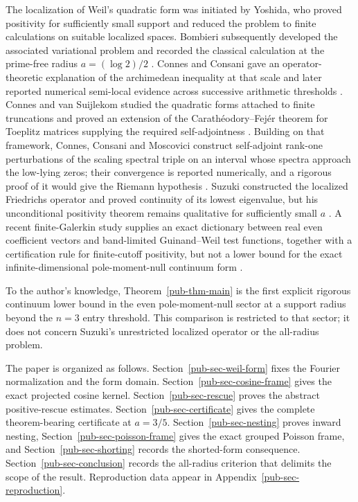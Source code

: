 \documentclass[11pt]{article}
\theoremstyle{remark}
\begin{document}
The localization of Weil's quadratic form was initiated by Yoshida,
who proved positivity for sufficiently small support and reduced the problem to finite calculations on suitable localized spaces.
Bombieri subsequently developed the associated variational problem and recorded the classical calculation at the prime-free radius \(a=(\log 2)/2\) \cite{Yoshida1992,Bombieri2000,Bombieri2003}.
Connes and Consani gave an operator-theoretic explanation of the archimedean inequality at that scale and later reported numerical semi-local evidence across successive arithmetic thresholds \cite{ConnesConsani2021,ConnesConsani2023}.
Connes and van Suijlekom studied the quadratic forms attached to finite truncations and proved an extension of the Carath\'eodory--Fej\'er theorem for Toeplitz matrices supplying the required self-adjointness \cite{ConnesVanSuijlekom2025}.
Building on that framework, Connes, Consani and Moscovici construct self-adjoint rank-one perturbations of the scaling spectral triple on an interval whose spectra approach the low-lying zeros;
their convergence is reported numerically, and a rigorous proof of it would give the Riemann hypothesis \cite{ConnesConsaniMoscovici2025}.
Suzuki constructed the localized Friedrichs operator and proved continuity of its lowest eigenvalue,
but his unconditional positivity theorem remains qualitative for sufficiently small \(a\) \cite{Suzuki2023,Suzuki2026}.
A recent finite-Galerkin study supplies an exact dictionary between real even coefficient vectors and band-limited Guinand--Weil test functions, together with a certification rule for finite-cutoff positivity,
but not a lower bound for the exact infinite-dimensional pole-moment-null continuum form \cite{Groskin2026}.

To the author's knowledge, Theorem~\ref{pub-thm-main} is the first explicit rigorous continuum lower bound in the even pole-moment-null sector at a support radius beyond the \(n=3\) entry threshold.
This comparison is restricted to that sector;
it does not concern Suzuki's unrestricted localized operator or the all-radius problem.

The paper is organized as follows.
Section~\ref{pub-sec-weil-form} fixes the Fourier normalization and the form domain.
Section~\ref{pub-sec-cosine-frame} gives the exact projected cosine kernel.
Section~\ref{pub-sec-rescue} proves the abstract positive-rescue estimates.
Section~\ref{pub-sec-certificate} gives the complete theorem-bearing certificate at \(a=3/5\).
Section~\ref{pub-sec-nesting} proves inward nesting,
Section~\ref{pub-sec-poisson-frame} gives the exact grouped Poisson frame,
and Section~\ref{pub-sec-shorting} records the shorted-form consequence.
Section~\ref{pub-sec-conclusion} records the all-radius criterion that delimits the scope of the result.
Reproduction data appear in Appendix~\ref{pub-sec-reproduction}.
\end{document}
